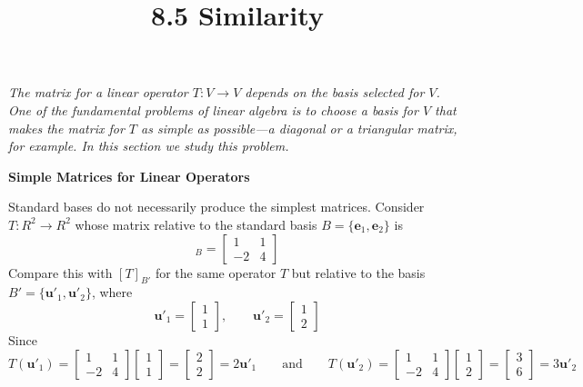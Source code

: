 \documentclass{article}
\title{8.5 Similarity}
\date{}
\author{}
\newcommand{\redheading}[1]{{\vspace{2mm}\noindent\Large\bfseries\color{red!55!black} #1\par}\vspace{2mm}}
\begin{document}
\maketitle

{\itshape\color{blue!45!black}
The matrix for a linear operator $T : V \to V$ depends on the basis selected for $V$.
One of the fundamental problems of linear algebra is to choose a basis for $V$ that makes
the matrix for $T$ as simple as possible---a diagonal or a triangular matrix, for example.
In this section we study this problem.\par}

\vspace{2mm}

\redheading{Simple Matrices for Linear Operators}

Standard bases do not necessarily produce the simplest matrices. Consider $T : R^2 \to R^2$
whose matrix relative to the standard basis $B = \{\mathbf{e}_1, \mathbf{e}_2\}$ is
\begin{equation}
  [T]_B = \begin{bmatrix}1 & 1\\-2 & 4\end{bmatrix} \tag{1}
\end{equation}
Compare this with $[T]_{B'}$ for the same operator $T$ but relative to the basis
$B' = \{\mathbf{u}'_1, \mathbf{u}'_2\}$, where
\begin{equation}
  \mathbf{u}'_1 = \begin{bmatrix}1\\1\end{bmatrix}, \qquad
  \mathbf{u}'_2 = \begin{bmatrix}1\\2\end{bmatrix} \tag{2}
\end{equation}
Since
\[
  T(\mathbf{u}'_1) = \begin{bmatrix}1&1\\-2&4\end{bmatrix}\begin{bmatrix}1\\1\end{bmatrix}
  = \begin{bmatrix}2\\2\end{bmatrix} = 2\mathbf{u}'_1 \qquad\text{and}\qquad
  T(\mathbf{u}'_2) = \begin{bmatrix}1&1\\-2&4\end{bmatrix}\begin{bmatrix}1\\2\end{bmatrix}
  = \begin{bmatrix}3\\6\end{bmatrix} = 3\mathbf{u}'_2
\]
\end{document}
